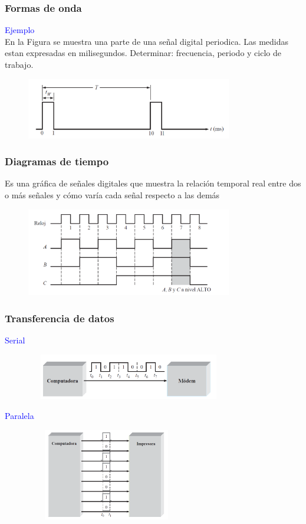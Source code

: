 \documentclass[10.5pt,scale=1.0,t,aspectratio=169,hyperref={pdfpagelabels=false}]{beamer}
\begin{document}
\begin{frame}
	\frametitle{Formas de onda}
	\textcolor{blue}{\large Ejemplo} \\
En la Figura se muestra una parte de una señal digital periodica. Las medidas estan expresadas en milisegundos. Determinar: frecuencia, periodo y ciclo de trabajo. 
\begin{figure}
	\centering
	\includegraphics[width=9cm]{EjemploFrecuenciaPeriodo}
\end{figure}	
\end{frame}
\begin{frame}
	\frametitle{Diagramas de tiempo}
	Es una gráfica de señales digitales que muestra la relación temporal real entre dos o más señales y cómo varía cada señal respecto a las demás 
\begin{figure}
	\centering
	\includegraphics[width=9cm]{DiagramasTiempo}
\end{figure}
\end{frame}

\begin{frame}
	\frametitle{Transferencia de datos}
	\textcolor{blue}{\large Serial} \\
\begin{figure}
	\centering
	\includegraphics[width=9cm,height=2cm]{TransferenciaSerial}
\end{figure}
\textcolor{blue}{\large Paralela} \\
\begin{figure}
	\centering
	\includegraphics[width=7cm,height=4cm]{TransferenciaParalela}
\end{figure}
\end{frame}
\end{document}
